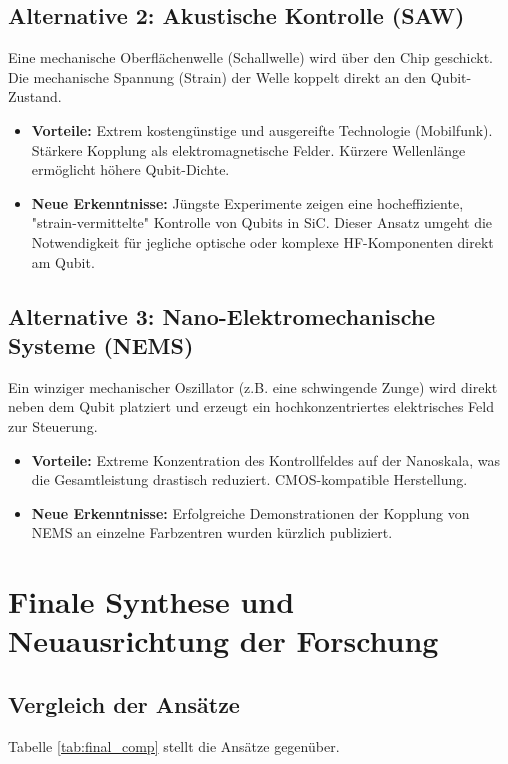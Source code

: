 \documentclass[12pt, a4paper, numbers]{report}
\begin{document}
\section{Alternative 2: Akustische Kontrolle (SAW)}
Eine mechanische Oberflächenwelle (Schallwelle) wird über den Chip geschickt. Die mechanische Spannung (Strain) der Welle koppelt direkt an den Qubit-Zustand.
\begin{itemize}
    \item \textbf{Vorteile:} Extrem kostengünstige und ausgereifte Technologie (Mobilfunk). Stärkere Kopplung als elektromagnetische Felder. Kürzere Wellenlänge ermöglicht höhere Qubit-Dichte.
    \item \textbf{Neue Erkenntnisse:} Jüngste Experimente zeigen eine hocheffiziente, "strain-vermittelte" Kontrolle von Qubits in SiC. Dieser Ansatz umgeht die Notwendigkeit für jegliche optische oder komplexe HF-Komponenten direkt am Qubit.
\end{itemize}

\section{Alternative 3: Nano-Elektromechanische Systeme (NEMS)}
Ein winziger mechanischer Oszillator (z.B. eine schwingende Zunge) wird direkt neben dem Qubit platziert und erzeugt ein hochkonzentriertes elektrisches Feld zur Steuerung.
\begin{itemize}
    \item \textbf{Vorteile:} Extreme Konzentration des Kontrollfeldes auf der Nanoskala, was die Gesamtleistung drastisch reduziert. CMOS-kompatible Herstellung.
    \item \textbf{Neue Erkenntnisse:} Erfolgreiche Demonstrationen der Kopplung von NEMS an einzelne Farbzentren wurden kürzlich publiziert.
\end{itemize}

\chapter{Finale Synthese und Neuausrichtung der Forschung}
\section{Vergleich der Ansätze}
Tabelle \ref{tab:final_comp} stellt die Ansätze gegenüber.
\end{document}

